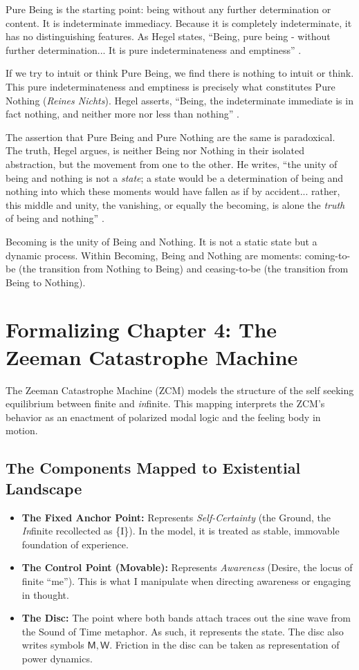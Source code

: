 \documentclass[12pt]{book}
\begin{document}
Pure Being is the starting point: being without any further determination or content. It is indeterminate immediacy. Because it is completely indeterminate, it has no distinguishing features. As Hegel states, ``Being, pure being - without further determination... It is pure indeterminateness and emptiness'' \parencite[59]{Hegel:2014aa}.

If we try to intuit or think Pure Being, we find there is nothing to intuit or think. This pure indeterminateness and emptiness is precisely what constitutes Pure Nothing (\textit{Reines Nichts}). Hegel asserts, ``Being, the indeterminate immediate is in fact nothing, and neither more nor less than nothing'' \parencite[59]{Hegel:2014aa}.

The assertion that Pure Being and Pure Nothing are the same is paradoxical. The truth, Hegel argues, is neither Being nor Nothing in their isolated abstraction, but the movement from one to the other. He writes, ``the unity of being and nothing is not a \textit{state}; a state would be a determination of being and nothing into which these moments would have fallen as if by accident... rather, this middle and unity, the vanishing, or equally the becoming, is alone the \textit{truth} of being and nothing'' \parencite[216]{Hegel:2014aa}.

Becoming is the unity of Being and Nothing. It is not a static state but a dynamic process. Within Becoming, Being and Nothing are moments: coming-to-be (the transition from Nothing to Being) and ceasing-to-be (the transition from Being to Nothing).

\section{Formalizing Chapter 4: The Zeeman Catastrophe Machine}

The Zeeman Catastrophe Machine (ZCM) models the structure of the self seeking equilibrium between finite and \textit{in}finite. This mapping interprets the ZCM's behavior as an enactment of polarized modal logic and the feeling body in motion.

\subsection{The Components Mapped to Existential Landscape}

\begin{itemize}
    \item \textbf{The Fixed Anchor Point:} Represents \textit{Self-Certainty} (the Ground, the \textit{In}finite recollected as \{I\}). In the model, it is treated as stable, immovable foundation of experience.
    \item \textbf{The Control Point (Movable):} Represents \textit{Awareness} (Desire, the locus of finite ``me''). This is what I manipulate when directing awareness or engaging in thought.
    \item \textbf{The Disc:} The point where both bands attach traces out the sine wave from the Sound of Time metaphor. As such, it represents the state. The disc also writes symbols $\mathsf{M}, \mathsf{W}$. Friction in the disc can be taken as representation of power dynamics.
\end{itemize}
\end{document}
